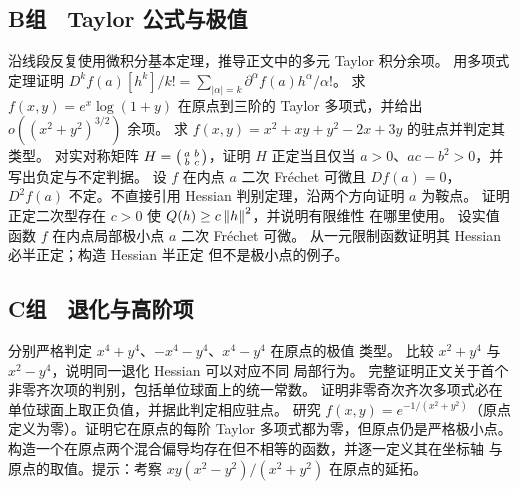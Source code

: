 \subsection*{B组　Taylor 公式与极值}
\begin{enumerate}[label=\textbf{\thechapter.\arabic*.},resume]
 沿线段反复使用微积分基本定理，推导正文中的多元 Taylor 积分余项。
 用多项式定理证明
 \(D^kf(a)[h^k]/k!=\sum_{|\alpha|=k}\partial^\alpha f(a)h^\alpha/\alpha!\)。
 求 \(f(x,y)=e^x\log(1+y)\) 在原点到三阶的 Taylor 多项式，并给出
 \(o((x^2+y^2)^{3/2})\) 余项。
 求 \(f(x,y)=x^2+xy+y^2-2x+3y\) 的驻点并判定其类型。
 对实对称矩阵
 \(H=\begin{psmallmatrix}a&b\\b&c\end{psmallmatrix}\)，证明
 \(H\) 正定当且仅当 \(a>0\)、\(ac-b^2>0\)，并写出负定与不定判据。
 设 \(f\) 在内点 \(a\) 二次 Fréchet 可微且 \(Df(a)=0\)，
 \(D^2f(a)\) 不定。不直接引用 Hessian 判别定理，沿两个方向证明
 \(a\) 为鞍点。
 证明正定二次型存在 \(c>0\) 使 \(Q(h)\ge c\left\lVert h\right\rVert^2\)，并说明有限维性
 在哪里使用。
 设实值函数 \(f\) 在内点局部极小点 \(a\) 二次 Fréchet 可微。
 从一元限制函数证明其 Hessian 必半正定；构造 Hessian 半正定
 但不是极小点的例子。
\end{enumerate}

\subsection*{C组　退化与高阶项}
\begin{enumerate}[label=\textbf{\thechapter.\arabic*.},resume]
 分别严格判定 \(x^4+y^4\)、\(-x^4-y^4\)、\(x^4-y^4\) 在原点的极值
 类型。
 比较 \(x^2+y^4\) 与 \(x^2-y^4\)，说明同一退化 Hessian 可以对应不同
 局部行为。
 完整证明正文关于首个非零齐次项的判别，包括单位球面上的统一常数。
 证明非零奇次齐次多项式必在单位球面上取正负值，并据此判定相应驻点。
 研究
 \(f(x,y)=e^{-1/(x^2+y^2)}\)（原点定义为零）。证明它在原点的每阶 Taylor
 多项式都为零，但原点仍是严格极小点。
 构造一个在原点两个混合偏导均存在但不相等的函数，并逐一定义其在坐标轴
 与原点的取值。提示：考察
 \(xy(x^2-y^2)/(x^2+y^2)\) 在原点的延拓。
\end{enumerate}
